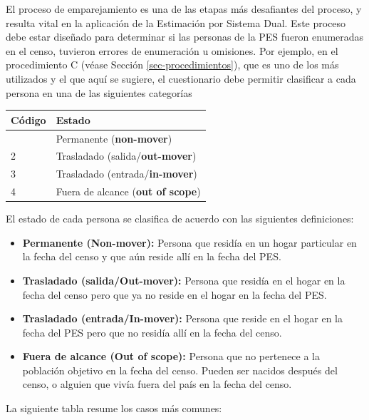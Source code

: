 \documentclass[
  12pt,
]{book}
\providecommand{\tightlist}{%
  \setlength{\itemsep}{0pt}\setlength{\parskip}{0pt}}
\begin{document}
El proceso de emparejamiento es una de las etapas más desafiantes del proceso, y resulta vital en la aplicación de la Estimación por Sistema Dual. Este proceso debe estar diseñado para determinar si las personas de la PES fueron enumeradas en el censo, tuvieron errores de enumeración u omisiones. Por ejemplo, en el procedimiento C (véase Sección \ref{sec-procedimientos}), que es uno de los más utilizados y el que aquí se sugiere, el cuestionario debe permitir clasificar a cada persona en una de las siguientes categorías

\begin{longtable}[]{@{}ll@{}}
\toprule\noalign{}
Código & Estado \\
\midrule\noalign{}
\endhead
\bottomrule\noalign{}
\endlastfoot
1 & Permanente (\textbf{non-mover}) \\
2 & Trasladado (salida/\textbf{out-mover}) \\
3 & Trasladado (entrada/\textbf{in-mover}) \\
4 & Fuera de alcance (\textbf{out of scope}) \\
\end{longtable}

El estado de cada persona se clasifica de acuerdo con las siguientes definiciones:

\begin{itemize}
\tightlist
\item
  \textbf{Permanente (Non-mover):} Persona que residía en un hogar particular en la fecha del censo y que aún reside allí en la fecha del PES.\\
\item
  \textbf{Trasladado (salida/Out-mover):} Persona que residía en el hogar en la fecha del censo pero que ya no reside en el hogar en la fecha del PES.\\
\item
  \textbf{Trasladado (entrada/In-mover):} Persona que reside en el hogar en la fecha del PES pero que no residía allí en la fecha del censo.\\
\item
  \textbf{Fuera de alcance (Out of scope):} Persona que no pertenece a la población objetivo en la fecha del censo. Pueden ser nacidos después del censo, o alguien que vivía fuera del país en la fecha del censo.
\end{itemize}

La siguiente tabla resume los casos más comunes:
\end{document}
